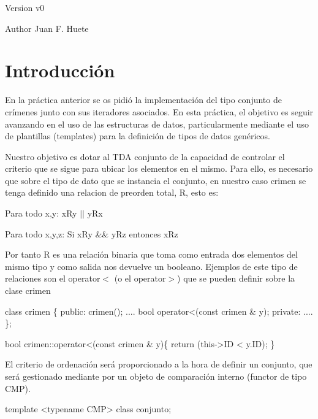 \begin{DoxyVersion}{Version}
v0 
\end{DoxyVersion}
\begin{DoxyAuthor}{Author}
Juan F. Huete
\end{DoxyAuthor}
\hypertarget{index_intro_sec}{}\section{Introducción}\label{index_intro_sec}
En la práctica anterior se os pidió la implementación del tipo conjunto de crímenes junto con sus iteradores asociados. En esta práctica, el objetivo es seguir avanzando en el uso de las estructuras de datos, particularmente mediante el uso de plantillas (templates) para la definición de tipos de datos genéricos.

Nuestro objetivo es dotar al T\+D\+A conjunto de la capacidad de controlar el criterio que se sigue para ubicar los elementos en el mismo. Para ello, es necesario que sobre el tipo de dato que se instancia el conjunto, en nuestro caso crimen se tenga definido una relacion de preorden total, R, esto es\+:

\begin{DoxyItemize}
\item Para todo x,y\+: x\+Ry $\vert$$\vert$ y\+Rx \item Para todo x,y,z\+: Si x\+Ry \&\& y\+Rz entonces x\+Rz\end{DoxyItemize}
Por tanto R es una relación binaria que toma como entrada dos elementos del mismo tipo y como salida nos devuelve un booleano. Ejemplos de este tipo de relaciones son el operator$<$ (o el operator$>$) que se pueden definir sobre la clase crimen 
\begin{DoxyCode}
\textcolor{keyword}{class }crimen \{
 \textcolor{keyword}{public}:
  crimen();
  ....
  \textcolor{keywordtype}{bool} operator<(\textcolor{keyword}{const} crimen & y);
 \textcolor{keyword}{private}:
  ....
\};

\textcolor{keywordtype}{bool} crimen::operator<(\textcolor{keyword}{const} crimen & y)\{
  \textcolor{keywordflow}{return} (this->ID < y.ID);
\}
\end{DoxyCode}


El criterio de ordenación será proporcionado a la hora de definir un conjunto, que será gestionado mediante por un objeto de comparación interno (functor de tipo C\+M\+P).


\begin{DoxyCode}
\textcolor{keyword}{template} <\textcolor{keyword}{typename} CMP> \textcolor{keyword}{class }conjunto;
\end{DoxyCode}


